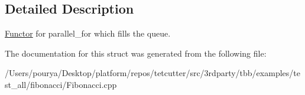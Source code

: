 \subsection{Detailed Description}
\hyperlink{structFunctor}{Functor} for parallel\+\_\+for which fills the queue. 

The documentation for this struct was generated from the following file\+:\begin{DoxyCompactItemize}
\item 
/\+Users/pourya/\+Desktop/platform/repos/tetcutter/src/3rdparty/tbb/examples/test\+\_\+all/fibonacci/Fibonacci.\+cpp\end{DoxyCompactItemize}
